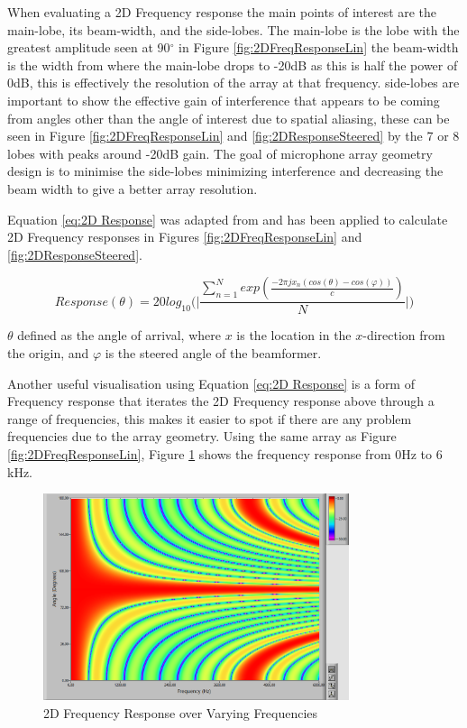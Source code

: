 \documentclass{UoNMCHA}
\numberwithin{equation}{section}
\begin{document}
    When evaluating a 2D Frequency response the main points of interest are the main-lobe, its beam-width, and the side-lobes. The main-lobe is the lobe with the greatest amplitude seen at 90$^{\circ}$ in Figure \ref{fig:2DFreqResponseLin} the beam-width is the width from where the main-lobe drops to -20dB as this is half the power of 0dB, this is effectively the resolution of the array at that frequency. side-lobes are important to show the effective gain of interference that appears to be coming from angles other than the angle of interest due to spatial aliasing, these can be seen in Figure \ref{fig:2DFreqResponseLin} and \ref{fig:2DResponseSteered} by the 7 or 8 lobes with peaks around -20dB gain. The goal of microphone array geometry design is to minimise the side-lobes minimizing interference and decreasing the beam width to give a better array resolution.
    
    Equation \ref{eq:2D Response} was adapted from \citet{Ben08} and has been applied to calculate 2D Frequency responses in Figures \ref{fig:2DFreqResponseLin} and \ref{fig:2DResponseSteered}.
    
    \begin{equation}
        Response(\theta) = 20log_{10} \Big( \Big|\frac{\sum_{n=1}^N exp(\frac{-2\pi jx_n(cos(\theta)-cos(\varphi))}{c})}{N}\Big| \Big)
        \label{eq:2D Response}
    \end{equation}
    
    $\theta$ defined as the angle of arrival, where $x$ is the location in the $x$-direction from the origin, and $\varphi$ is the steered angle of the beamformer.
    
    Another useful visualisation using Equation \ref{eq:2D Response} is a form of Frequency response that iterates the 2D Frequency response above through a range of frequencies, this makes it easier to spot if there are any problem frequencies due to the array geometry. Using the same array as Figure \ref{fig:2DFreqResponseLin}, Figure \ref{fig:2DVaryFreqResp} shows the frequency response from $0$Hz to $6$kHz.
    
    \begin{figure}[H]
        \centering
        \includegraphics[keepaspectratio, width = 0.8\textwidth]{Figures/2DVaryFreqResp.png}
        \caption{2D Frequency Response over Varying Frequencies}
        \label{fig:2DVaryFreqResp}
    \end{figure}
    
\end{document}
